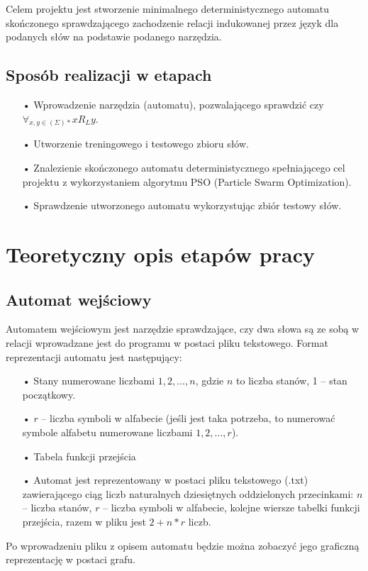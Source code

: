 \documentclass{llncs}
\begin{document}
Celem projektu jest stworzenie minimalnego deterministycznego automatu skończonego sprawdzającego zachodzenie relacji indukowanej przez język dla podanych słów na podstawie podanego narzędzia.

\subsection{Sposób realizacji w etapach}

\begin{enumerate}
\item[•] Wprowadzenie narzędzia (automatu), pozwalającego sprawdzić czy $\forall_{x,y \in (\Sigma)*} x R_{L} y$.
\item[•] Utworzenie treningowego i testowego zbioru słów.
\item[•] Znalezienie skończonego automatu deterministycznego spełniającego cel projektu z wykorzystaniem algorytmu PSO (Particle Swarm Optimization).
\item[•] Sprawdzenie utworzonego automatu wykorzystując zbiór testowy słów.
\end{enumerate}

\newpage

\section{Teoretyczny opis etapów pracy}

\subsection{Automat wejściowy}

Automatem wejściowym jest narzędzie sprawdzające, czy dwa słowa są ze sobą w relacji wprowadzane jest do programu w postaci pliku tekstowego. Format reprezentacji automatu jest następujący:

\begin{itemize}
\item[•] Stany numerowane liczbami $1, 2, …, n$, gdzie $n$ to liczba stanów, 1 – stan początkowy.
\item[•] $r$ – liczba symboli w alfabecie (jeśli jest taka potrzeba, to numerować symbole alfabetu numerowane liczbami $1, 2, ..., r$).
\item[•] Tabela funkcji przejścia
\item[•] Automat jest reprezentowany w postaci pliku tekstowego (.txt) zawierającego ciąg liczb naturalnych dziesiętnych oddzielonych przecinkami: $n$ – liczba stanów, $r$ – liczba symboli w alfabecie, kolejne wiersze tabelki funkcji przejścia, razem w pliku jest $2 + n*r$ liczb.
\end{itemize}
Po wprowadzeniu pliku z opisem automatu będzie można zobaczyć jego graficzną reprezentację w postaci grafu.
\end{document}
